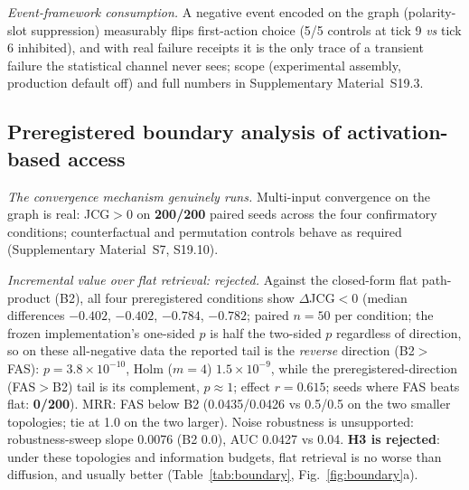 \documentclass[10pt]{article}
\begin{document}
\emph{Event-framework consumption.} A negative event encoded on the graph (polarity-slot suppression) measurably flips first-action choice (5/5 controls at tick 9 \emph{vs} tick 6 inhibited), and with real failure receipts it is the only trace of a transient failure the statistical channel never sees; scope (experimental assembly, production default off) and full numbers in Supplementary Material~S19.3.

\subsection{Preregistered boundary analysis of activation-based access}
\label{sec:res-boundary}

\emph{The convergence mechanism genuinely runs.} Multi-input convergence on the graph is real: JCG${>}$0 on \textbf{200/200} paired seeds across the four confirmatory conditions; counterfactual and permutation controls behave as required (Supplementary Material~S7, S19.10).

\emph{Incremental value over flat retrieval: rejected.} Against the closed-form flat path-product (B2), all four preregistered conditions show $\Delta$JCG${<}0$ (median differences ${-}0.402$, ${-}0.402$, ${-}0.784$, ${-}0.782$; paired $n{=}50$ per condition; the frozen implementation's one-sided $p$ is half the two-sided $p$ regardless of direction, so on these all-negative data the reported tail is the \emph{reverse} direction (B2${>}$FAS): $p{=}3.8\times10^{-10}$, Holm ($m{=}4$) $1.5\times10^{-9}$, while the preregistered-direction (FAS${>}$B2) tail is its complement, $p{\approx}1$; effect $r{=}0.615$; seeds where FAS beats flat: \textbf{0/200}). MRR: FAS below B2 (0.0435/0.0426 vs 0.5/0.5 on the two smaller topologies; tie at 1.0 on the two larger). Noise robustness is unsupported: robustness-sweep slope 0.0076 (B2 0.0), AUC 0.0427 vs 0.04. \textbf{H3 is rejected}: under these topologies and information budgets, flat retrieval is no worse than diffusion, and usually better (Table~\ref{tab:boundary}, Fig.~\ref{fig:boundary}a).
\end{document}
